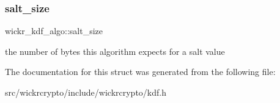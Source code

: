 \subsubsection{\texorpdfstring{salt\+\_\+size}{salt\_size}}
{\footnotesize\ttfamily wickr\+\_\+kdf\+\_\+algo\+::salt\+\_\+size}

the number of bytes this algorithm expects for a salt value 

The documentation for this struct was generated from the following file\+:\begin{DoxyCompactItemize}
\item 
src/wickrcrypto/include/wickrcrypto/kdf.\+h\end{DoxyCompactItemize}
